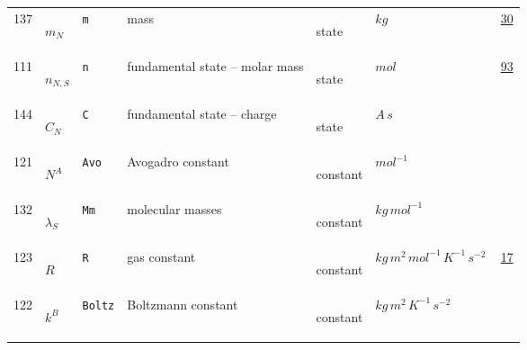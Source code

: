 \begin{longtable}{|p{1cm}|p{2.5cm}|p{4.5cm}|p{8cm}|p{3.0cm}|p{3cm}|p{1cm}|}
            137
             & \hypertarget{"v:137"}{ $ {m}{_{N}} $}
             & \verb|m|
             & mass
             & \begin{lay}state \end{lay}
             & $ kg \, $
             &                 \hyperlink{"e:30"}{ 30 }
                 \\
            111
             & \hypertarget{"v:111"}{ $ {n}{_{N, S}} $}
             & \verb|n|
             & fundamental state -- molar mass
             & \begin{lay}state \end{lay}
             & $ mol \, $
             &                 \hyperlink{"e:93"}{ 93 }
                 \\
            144
             & \hypertarget{"v:144"}{ $ {C}{_{N}} $}
             & \verb|C|
             & fundamental state -- charge
             & \begin{lay}state \end{lay}
             & $ A \,s \, $
             & \\
            121
             & \hypertarget{"v:121"}{ $ {{N^A}}{_{}} $}
             & \verb|Avo|
             & Avogadro constant
             & \begin{lay}constant \end{lay}
             & $ mol^{-1} \, $
             & \\
            132
             & \hypertarget{"v:132"}{ $ {{\lambda}}{_{S}} $}
             & \verb|Mm|
             & molecular masses
             & \begin{lay}constant \end{lay}
             & $ kg \,mol^{-1} \, $
             & \\
            123
             & \hypertarget{"v:123"}{ $ {R}{_{}} $}
             & \verb|R|
             & gas constant
             & \begin{lay}constant \end{lay}
             & $ kg \,m^{2} \,mol^{-1} \,K^{-1} \,s^{-2} \, $
             &                 \hyperlink{"e:17"}{ 17 }
                 \\
            122
             & \hypertarget{"v:122"}{ $ {{k^B}}{_{}} $}
             & \verb|Boltz|
             & Boltzmann constant
             & \begin{lay}constant \end{lay}
             & $ kg \,m^{2} \,K^{-1} \,s^{-2} \, $
             & \\

\end{longtable}
